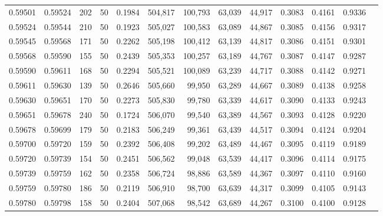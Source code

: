 \begin{tabular}{rrrrrrrrrrrrr}
0.59501 & 0.59524 &   202 &  50 &                                     0.1984 & 504,817 & 100,793 &  63,039 &  44,917 & 0.3083 & 0.4161 & 0.9336 \\
0.59524 & 0.59544 &   210 &  50 &                                     0.1923 & 505,027 & 100,583 &  63,089 &  44,867 & 0.3085 & 0.4156 & 0.9317 \\
0.59545 & 0.59568 &   171 &  50 &                                     0.2262 & 505,198 & 100,412 &  63,139 &  44,817 & 0.3086 & 0.4151 & 0.9301 \\
0.59568 & 0.59590 &   155 &  50 &                                     0.2439 & 505,353 & 100,257 &  63,189 &  44,767 & 0.3087 & 0.4147 & 0.9287 \\
0.59590 & 0.59611 &   168 &  50 &                                     0.2294 & 505,521 & 100,089 &  63,239 &  44,717 & 0.3088 & 0.4142 & 0.9271 \\
0.59611 & 0.59630 &   139 &  50 &                                     0.2646 & 505,660 &  99,950 &  63,289 &  44,667 & 0.3089 & 0.4138 & 0.9258 \\
0.59630 & 0.59651 &   170 &  50 &                                     0.2273 & 505,830 &  99,780 &  63,339 &  44,617 & 0.3090 & 0.4133 & 0.9243 \\
0.59651 & 0.59678 &   240 &  50 &                                     0.1724 & 506,070 &  99,540 &  63,389 &  44,567 & 0.3093 & 0.4128 & 0.9220 \\
0.59678 & 0.59699 &   179 &  50 &                                     0.2183 & 506,249 &  99,361 &  63,439 &  44,517 & 0.3094 & 0.4124 & 0.9204 \\
0.59700 & 0.59720 &   159 &  50 &                                     0.2392 & 506,408 &  99,202 &  63,489 &  44,467 & 0.3095 & 0.4119 & 0.9189 \\
0.59720 & 0.59739 &   154 &  50 &                                     0.2451 & 506,562 &  99,048 &  63,539 &  44,417 & 0.3096 & 0.4114 & 0.9175 \\
0.59739 & 0.59759 &   162 &  50 &                                     0.2358 & 506,724 &  98,886 &  63,589 &  44,367 & 0.3097 & 0.4110 & 0.9160 \\
0.59759 & 0.59780 &   186 &  50 &                                     0.2119 & 506,910 &  98,700 &  63,639 &  44,317 & 0.3099 & 0.4105 & 0.9143 \\
0.59780 & 0.59798 &   158 &  50 &                                     0.2404 & 507,068 &  98,542 &  63,689 &  44,267 & 0.3100 & 0.4100 & 0.9128 \\

\end{tabular}
